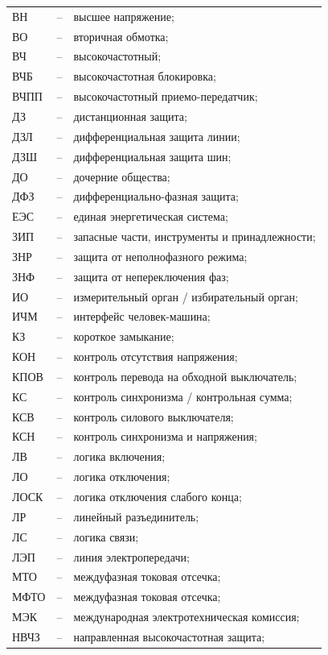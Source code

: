 \begin{longtable}{L{2cm} L{0.5cm} L{20cm}}
ВН & -- & высшее напряжение; \\
ВО & -- & вторичная обмотка; \\
ВЧ & -- & высокочастотный; \\
ВЧБ & -- & высокочастотная блокировка; \\
ВЧПП & -- & высокочастотный приемо-передатчик; \\
ДЗ & -- & дистанционная защита; \\
ДЗЛ & -- & дифференциальная защита линии; \\
ДЗШ & -- & дифференциальная защита шин; \\
ДО & -- & дочерние общества; \\
ДФЗ & -- & дифференциально-фазная защита; \\
ЕЭС & -- & единая энергетическая система; \\
ЗИП & -- & запасные части, инструменты и принадлежности; \\
ЗНР & -- & защита от неполнофазного режима; \\
ЗНФ & -- & защита от непереключения фаз; \\
ИО & -- & измерительный орган / избирательный орган; \\
ИЧМ & -- & интерфейс человек-машина; \\
КЗ & -- & короткое замыкание; \\
КОН & -- & контроль отсутствия напряжения; \\
КПОВ & -- & контроль перевода на обходной выключатель; \\
КС & -- & контроль синхронизма / контрольная сумма; \\
КСВ & -- & контроль силового выключателя; \\
КСН & -- & контроль синхронизма и напряжения; \\
ЛВ & -- & логика включения; \\
ЛО & -- & логика отключения; \\
ЛОСК & -- & логика отключения слабого конца; \\
ЛР & -- & линейный разъединитель; \\
ЛС & -- & логика связи; \\
ЛЭП & -- & линия электропередачи; \\
МТО & -- & междуфазная токовая отсечка; \\
МФТО & -- & междуфазная токовая отсечка; \\
МЭК & -- & международная электротехническая комиссия; \\
НВЧЗ & -- & направленная высокочастотная защита; \\

\end{longtable}
